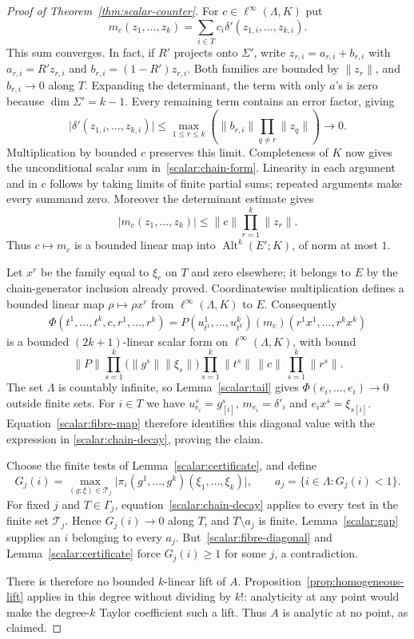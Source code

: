 \documentclass[11pt]{amsart}
\theoremstyle{definition}
\theoremstyle{remark}
\numberwithin{equation}{section}
\newcommand{\Alt}{\operatorname{Alt}}
\newcommand{\linf}{\ell^\infty}
\newcommand{\abs}[1]{\lvert #1\rvert}
\newcommand{\norm}[1]{\lVert #1\rVert}
\theoremstyle{plain}
\theoremstyle{definition}
\theoremstyle{plain}
\begin{document}
\begin{proof}[Proof of Theorem~\ref{thm:scalar-counter}]
For $c\in\linf(\Lambda,K)$ put
\begin{equation}\label{scalar:chain-form}
 m_c(z_1,\dots,z_k)=\sum_{i\in T}c_i\delta'(z_{1,i},\dots,z_{k,i}).
\end{equation}
This sum converges. In fact, if $R'$ projects onto $\Sigma'$, write
$z_{r,i}=a_{r,i}+b_{r,i}$ with $a_{r,i}=R'z_{r,i}$ and $b_{r,i}=(1-R')z_{r,i}$. Both families are bounded
by $\norm{z_r}$, and $b_{r,i}\to0$ along $T$. Expanding the determinant, the term with only $a$'s is
zero because $\dim\Sigma'=k-1$. Every remaining term contains an error factor, giving
\[
 \abs{\delta'(z_{1,i},\dots,z_{k,i})}
 \le\max_{1\le r\le k}\left(\norm{b_{r,i}}\prod_{q\ne r}\norm{z_q}\right)
 \longrightarrow0.
\]
Multiplication by bounded $c$ preserves this limit. Completeness of $K$ now gives the unconditional
scalar sum in~\eqref{scalar:chain-form}. Linearity in each argument and in $c$ follows by taking limits
of finite partial sums; repeated arguments make every summand zero. Moreover the determinant estimate gives
\[
 \abs{m_c(z_1,\dots,z_k)}\le\norm c\prod_{r=1}^k\norm{z_r}.
\]
Thus $c\mapsto m_c$ is a bounded linear map into $\Alt^k(E';K)$, of norm at most $1$.

Let $x^r$ be the family equal to $\xi_r$ on $T$ and zero elsewhere; it belongs to $E$ by the
chain-generator inclusion already proved. Coordinatewise multiplication defines a bounded linear map
$\rho\mapsto\rho x^r$ from $\linf(\Lambda,K)$ to $E$. Consequently
\[
 \begin{split}
 \Phi(t^1,\dots,t^k,c,r^1,\dots,r^k)
   =P(u^1_{t^1},\dots,u^k_{t^k})(m_c)(r^1x^1,\dots,r^kx^k)
 \end{split}
\]
is a bounded $(2k+1)$\nobreakdash-linear scalar form on $\linf(\Lambda,K)$, with bound
\[
 \norm P\prod_{s=1}^k\bigl(\norm{g^s}\norm{\xi_s}\bigr)
       \prod_{s=1}^k\norm{t^s}\,\norm c\,\prod_{s=1}^k\norm{r^s}.
\]
The set $\Lambda$ is countably infinite, so Lemma~\ref{scalar:tail} gives
$\Phi(e_i,\dots,e_i)\to0$ outside finite sets. For $i\in T$ we have
$u^s_{e_i}=g^s_{[i]}$, $m_{e_i}=\delta'_i$ and $e_i x^s=\xi_{s[i]}$.
Equation~\eqref{scalar:fibre-map} therefore identifies this diagonal value with the expression in
\eqref{scalar:chain-decay}, proving the claim.

Choose the finite tests of Lemma~\ref{scalar:certificate}, and define
\[
 G_j(i)=\max_{(g;\xi)\in\mathcal T_j}
       \abs{\pi_i(g^1,\dots,g^k)(\xi_1,\dots,\xi_k)},
 \qquad a_j=\{i\in\Lambda:G_j(i)<1\}.
\]
For fixed $j$ and $T\in\Gamma_j$, equation~\eqref{scalar:chain-decay} applies to every test in the finite
set $\mathcal T_j$. Hence $G_j(i)\to0$ along $T$, and $T\setminus a_j$ is finite. Lemma~\ref{scalar:gap}
supplies an $i$ belonging to every $a_j$. But~\eqref{scalar:fibre-diagonal} and
Lemma~\ref{scalar:certificate} force $G_j(i)\ge1$ for some $j$, a contradiction.

There is therefore no bounded $k$\nobreakdash-linear lift of $A$. Proposition~\ref{prop:homogeneous-lift} applies in
this degree without dividing by $k!$: analyticity at any point would make the degree-$k$ Taylor coefficient
such a lift. Thus $A$ is analytic at no point, as claimed.
\end{proof}
\end{document}
